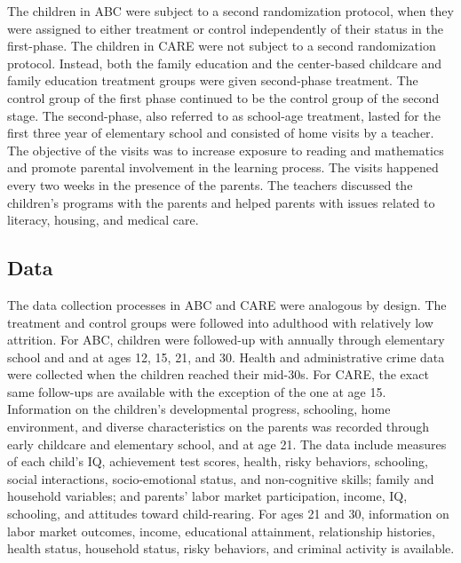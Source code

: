 \noindent The children in ABC were subject to a second randomization protocol, when they were assigned to either treatment or control independently of their status in the first-phase. The children in CARE were not subject to a second randomization protocol. Instead, both the family education and the center-based childcare and family education treatment groups were given second-phase treatment. The control group of the first phase continued to be the control group of the second stage. The second-phase, also referred to as school-age treatment, lasted for the first three year of elementary school and consisted of home visits by a teacher. The objective of the visits was to increase exposure to reading and mathematics and promote parental involvement in the learning process. The visits happened every two weeks in the presence of the parents. The teachers discussed the children's programs with the parents and helped parents with issues related to literacy, housing, and medical care.\\ 

\subsection{Data} \label{section:data}

\noindent The data collection processes in ABC and CARE were analogous by design. The treatment and control groups were followed into adulthood with relatively low attrition. For ABC, children were followed-up with annually through elementary school and and at ages 12, 15, 21, and 30. Health and administrative crime data were collected when the children reached their mid-30s. For CARE, the exact same follow-ups are available with the exception of the one at age 15.\\

\noindent Information on the children’s developmental progress, schooling, home environment, and diverse characteristics on the parents was recorded through early childcare and elementary school, and at age 21. The data include measures of each child’s IQ, achievement test scores, health, risky behaviors, schooling, social interactions, socio-emotional status, and non-cognitive skills; family and household variables; and parents’ labor market participation, income, IQ, schooling, and attitudes toward child-rearing. For ages 21 and 30, information on labor market outcomes, income, educational attainment, relationship histories, health status, household status, risky behaviors, and criminal activity is available.\\

